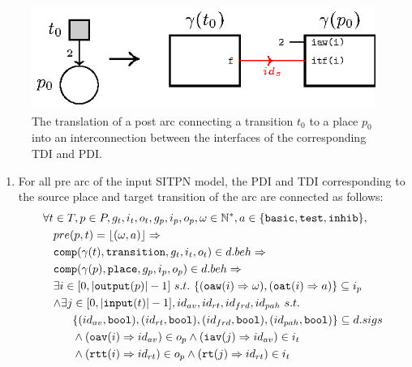 \begin{definition}
  \begin{figure}[h]
    \centering
    \includegraphics[keepaspectratio,width=.7\textwidth]{gen-post-arc.eps}
    \caption{The translation of a post arc connecting a transition
      $t_0$ to a place $p_0$ into an interconnection between the
      interfaces of the corresponding TDI and PDI.}
    \label{fig:gen-post-arc}
  \end{figure}
  
  \begin{enumerate}[resume]
  \item\label{it:pre-arc} For all pre arc of the input SITPN model,
    the PDI and TDI corresponding to the source place and target
    transition of the arc are connected as follows:
    \begin{equation*}
      \begin{aligned}[t]
        \forall{}t&\in{}T,p\in{}P,g_t,i_t,o_t,g_p,i_p,o_p,\omega\in\mathbb{N}^{*},a\in\{\mathtt{basic},\mathtt{test},\mathtt{inhib}\}, \\
                  & pre(p,t)=\lfloor(\omega,a)\rfloor\Rightarrow \\
                  & \tdiInBeh\Rightarrow \\
                  & \pdiInBeh\Rightarrow\\
                  & \exists{}i\in[0,\vert\mathtt{output}(p)\vert-1]~s.t.~\{(\mathtt{oaw}(i)\Rightarrow\omega),(\mathtt{oat}(i)\Rightarrow{}a)\}\subseteq{}i_p \\
                  & \begin{aligned}[t]
                      \land\exists{}j &\in[0,\vert\mathtt{input}(t)\vert-1],id_{av},id_{rt},id_{frd},id_{pah}~s.t. \\
                                      & \{(id_{av},\mathtt{bool}),(id_{rt},\mathtt{bool}),(id_{frd},\mathtt{bool}),(id_{pah},\mathtt{bool})\}\subseteq{}d.sigs \\
                                      & \land(\mathtt{oav}(i)\Rightarrow{}id_{av})\in{}o_p\land(\mathtt{iav}(j)\Rightarrow{}id_{av})\in{}i_t \\
                                      & \land(\mathtt{rtt}(i)\Rightarrow{}id_{rt})\in{}o_p\land(\mathtt{rt}(j)\Rightarrow{}id_{rt})\in{}i_t \\

\end{aligned}
\end{aligned}
\end{equation*}
\end{enumerate}
\end{definition}
